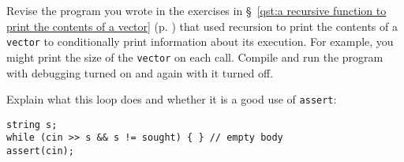%
%
\begin{question}
Revise the program you wrote in the exercises in \S~\ref{qst:a recursive function to print the contents of a vector} (p. \pageref{qst:a recursive function to print the contents of a vector})
that used recursion to print the contents of a \verb|vector| to conditionally
print information about its execution. For example, you might print the size of
the \verb|vector| on each call. Compile and run the program with debugging
turned on and again with it turned off.
\end{question}

\begin{question}
Explain what this loop does and whether it is a good use of \verb|assert|:
\begin{lstlisting}
string s;
while (cin >> s && s != sought) { } // empty body
assert(cin);
\end{lstlisting}
\end{question}
